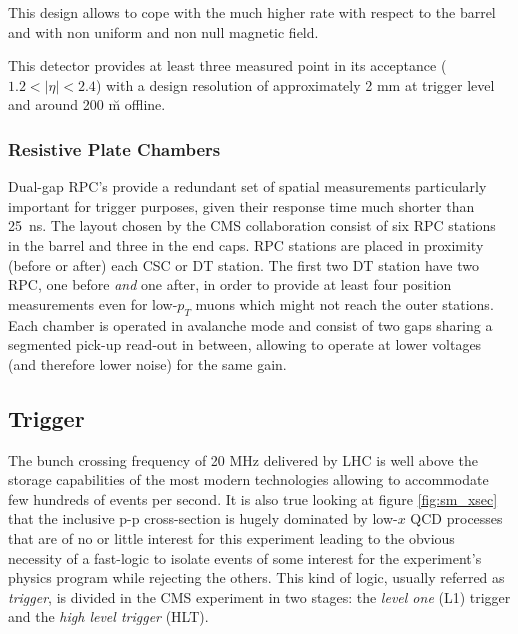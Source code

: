 This design allows to cope with the much higher rate with respect to the barrel and with non uniform and non null magnetic field. 

This detector provides at least three measured point in its acceptance ($1.2 < |\eta| < 2.4$) with a design resolution of approximately 2 mm at trigger level and around 200 \u m offline.

\subsubsection*{Resistive Plate Chambers}

Dual-gap RPC's provide a redundant set of spatial measurements particularly important for trigger purposes, given their response time much shorter than 25~ns. The layout chosen by the CMS collaboration consist of six RPC stations in the barrel and three in the end caps. RPC stations are placed in proximity (before or after) each CSC or DT station. The first two DT station have two RPC, one before \emph{and} one after, in order to provide at least four position measurements even for low-$p_T$ muons which might not reach the outer stations. Each chamber is operated in avalanche mode and consist of two gaps sharing a segmented pick-up read-out in between, allowing to operate at lower voltages (and therefore lower noise) for the same gain. 

\subsection{Trigger}

The bunch crossing frequency of 20 MHz delivered by LHC is well above the storage capabilities of the most modern technologies allowing to accommodate few hundreds of events per second. It is also true looking at figure 
\ref{fig:sm_xsec} %
that the inclusive p-p cross-section is hugely dominated by low-$x$ QCD processes that are of no or little interest for this experiment leading to the obvious necessity of a fast-logic to isolate events of some interest for the experiment's physics program while rejecting the others. This kind of logic, usually referred as \emph{trigger}, is divided in the CMS experiment in two stages: the \emph{level one} (L1) trigger and the \emph{high level trigger} (HLT). 

